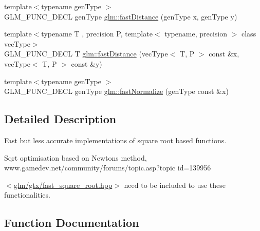 \begin{DoxyCompactItemize}
\item 
{\footnotesize template$<$typename gen\+Type $>$ }\\G\+L\+M\+\_\+\+F\+U\+N\+C\+\_\+\+D\+E\+CL gen\+Type \hyperlink{group__gtx__fast__square__root_gaac333418d0c4e0cc6d3d219ed606c238}{glm\+::fast\+Distance} (gen\+Type x, gen\+Type y)
\item 
{\footnotesize template$<$typename T , precision P, template$<$ typename, precision $>$ class vec\+Type$>$ }\\G\+L\+M\+\_\+\+F\+U\+N\+C\+\_\+\+D\+E\+CL T \hyperlink{group__gtx__fast__square__root_ga6d1ac559cd77d69119e30c3aca0e14b5}{glm\+::fast\+Distance} (vec\+Type$<$ T, P $>$ const \&x, vec\+Type$<$ T, P $>$ const \&y)
\item 
{\footnotesize template$<$typename gen\+Type $>$ }\\G\+L\+M\+\_\+\+F\+U\+N\+C\+\_\+\+D\+E\+CL gen\+Type \hyperlink{group__gtx__fast__square__root_ga3b02c1d6e0c754144e2f1e110bf9f16c}{glm\+::fast\+Normalize} (gen\+Type const \&x)
\end{DoxyCompactItemize}


\subsection{Detailed Description}
Fast but less accurate implementations of square root based functions. 


\begin{DoxyItemize}
\item Sqrt optimisation based on Newton\textquotesingle{}s method, www.\+gamedev.\+net/community/forums/topic.asp?topic id=139956
\end{DoxyItemize}

$<$\hyperlink{fast__square__root_8hpp}{glm/gtx/fast\+\_\+square\+\_\+root.\+hpp}$>$ need to be included to use these functionalities. 

\subsection{Function Documentation}
\mbox{\label{group__gtx__fast__square__root_gaac333418d0c4e0cc6d3d219ed606c238}} 
